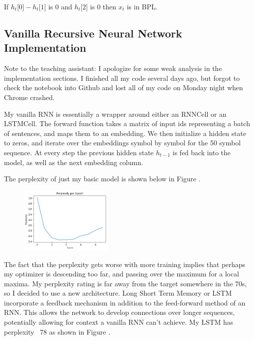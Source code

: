 If $h_t \lbrack 0 \rbrack - h_t \lbrack 1 \rbrack $ is 0 and $h_t \lbrack 2 \rbrack $ is 0 then $x_t$ is in BPL.

\subsection*{Vanilla Recursive Neural Network Implementation}

Note to the teaching assistant: I apologize for some weak analysis in the implementation sections. I finished all my code several days ago, but forgot to check the notebook into Github and lost all of my code on Monday night when Chrome crashed. 

My vanilla RNN is essentially a wrapper around either an RNNCell or an LSTMCell. The forward function takes a matrix of input ids representing a batch of sentences, and maps them to an embedding. We then initialize a hidden state to zeros, and iterate over the embeddings symbol by symbol for the 50 symbol sequence. At every step the previous hidden state $h_{t-1}$ is fed back into the model, as well as the next embedding column. 

The perplexity of just my basic model is shown below in Figure \label{firsttry}. 

\begin{figure}[h]
    \centering
    \includegraphics[width=0.4\textwidth]{resources/png/no_bias_1e3.png}
    \label{firsttry}
\end{figure}

The fact that the perplexity gets worse with more training implies that perhaps my optimizer is descending too far, and passing over the maximum for a local maxima. My perplexity rating is far away from the target somewhere in the 70s, so I decided to use a new architecture. Long Short Term Memory or LSTM incorporate a feedback mechanism in addition to the feed-forward method of an RNN. This allows the network to develop connections over longer sequences, potentially allowing for context a vanilla RNN can't achieve. My LSTM has perplexity ~78 as shown in Figure \label{secondtry}.

